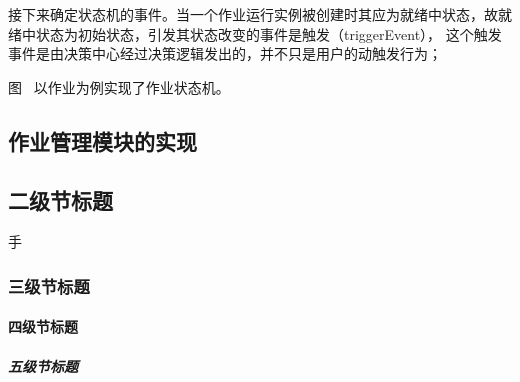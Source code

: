 接下来确定状态机的事件。当一个作业运行实例被创建时其应为就绪中状态，故就绪中状态为初始状态，引发其状态改变的事件是触发（triggerEvent），
这个触发事件是由决策中心经过决策逻辑发出的，并不只是用户的动触发行为；


图~ 以作业为例实现了作业状态机。



\subsection{作业管理模块的实现}



\subsection{二级节标题}手

\subsubsection{三级节标题}

\paragraph{四级节标题}

\subparagraph{五级节标题}
